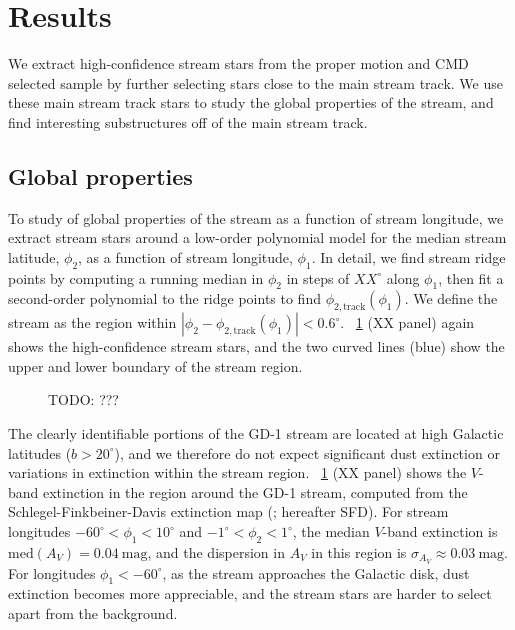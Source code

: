 \documentclass[modern]{aastex62}
\newcommand{\todo}[1]{{\color{red} TODO: #1}}
\begin{document}
\section{Results}
\label{sec:results}

We extract high-confidence stream stars from the proper motion and CMD selected
sample by further selecting stars close to the main stream track.
We use these main stream track stars to study the global properties of the
stream, and find interesting substructures off of the main stream track.

\subsection{Global properties}
\label{sec:res_global}

To study of global properties of the stream as a function of stream longitude,
we extract stream stars around a low-order polynomial model for the median
stream latitude, $\phi_2$, as a function of stream longitude, $\phi_1$.
In detail, we find stream ridge points by computing a running median in $\phi_2$
in steps of $XX^\circ$ along $\phi_1$, then fit a second-order polynomial to the
ridge points to find $\phi_{2, \textrm{track}}(\phi_1)$.
We define the stream as the region within $\left| \phi_2 - \phi_{2,
\textrm{track}}(\phi_1) \right| < 0.6^\circ$.
\figurename~\ref{fig:XX} (XX panel) again shows the high-confidence
stream stars, and the two curved lines (blue) show the upper and lower boundary
of the stream region.

\begin{figure}[h]
\begin{center}
\end{center}
\caption{%
\todo{???}
\label{fig:XX}
}
\end{figure}

The clearly identifiable portions of the GD-1 stream are located at high
Galactic latitudes ($b > 20^\circ$), and we therefore do not expect significant
dust extinction or variations in extinction within the stream region.
\figurename~\ref{fig:XX} (XX panel) shows the $V$-band extinction
in the region around the GD-1 stream, computed from the
Schlegel-Finkbeiner-Davis extinction map (\cite{Schlegel:1998}; hereafter SFD).
For stream longitudes $-60^\circ < \phi_1 < 10^\circ$ and $-1^\circ < \phi_2 <
1^\circ$, the median $V$-band extinction is $\textrm{med}\left(A_V\right) =
0.04~\textrm{mag}$, and the dispersion in $A_V$ in this region is $\sigma_{A_V}
\approx 0.03~\textrm{mag}$.
For longitudes $\phi_1 < -60^\circ$, as the stream approaches the Galactic disk,
dust extinction becomes more appreciable, and the stream stars are harder to
select apart from the background.
\end{document}
